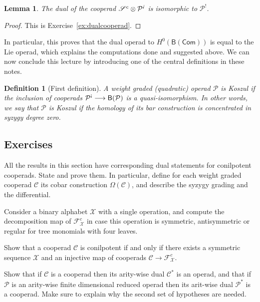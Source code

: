 \documentclass[fleqn, a4paper, twoside]{article}
\newcommand{\antishriek}{\text{\raisebox{\depth}{\textexclamdown}}}
\newcommand{\0}{\langle 0\rangle}
\newcommand{\XX}{\mathcal{X}}
\newcommand{\FF}{\mathcal{F}}
\newcommand{\B}[1]{\mathsf{B}(#1)}
\DeclareRobustCommand{\[}{\begin{equation}}%
\DeclareRobustCommand{\]}{\end{equation}}%
\theoremstyle{mytheorem}
\newtheorem{lemma}[theorem]{Lemma}
\theoremstyle{introthm}
\theoremstyle{mydefinition}
\newtheorem{definition}[theorem]{Definition}
\theoremstyle{mydefinition2}
\theoremstyle{plain} %
\newcommand{\Com}{\mathsf{Com}}
\newcommand{\CC}{\mathcal{C}}
\newcommand{\?}{\,?\,}
\newcommand{\PP}{{\mathcal{P}}}
\theoremstyle{mytheorem}
\theoremstyle{plain} %
\begin{document}
\begin{lemma}\label{lemma:dualcooperad}
The dual of the cooperad  $\sus^c\otimes \PP^\emph{\antishriek}$
is isomorphic to $\PP^!$.
\end{lemma}

\begin{proof}
This is Exercise~\ref{ex:dualcooperad}. 
\end{proof}

In particular, this proves that the dual operad to $H^0(\B{\Com})$ is
equal to the Lie operad, which explains the computations done and suggested
above. We can now conclude this lecture by introducing one of the
central definitions in these notes.

\begin{definition}[First definition]
A weight graded (quadratic) operad $\PP$ is Koszul if
the inclusion of cooperads $\PP^\antishriek \longrightarrow \B{\PP}$
is a quasi-isomorphism. In other words, we say that $\PP$
is Koszul if the homology of its bar construction is
concentrated in syzygy degree zero.
\end{definition}

\subsection{Exercises}	

\begin{question}
All the results in this section have corresponding
dual statements for conilpotent cooperads. State and
prove them. In particular, define for each weight graded
cooperad $\CC$ its cobar construction $\Omega(\CC)$,
and describe the syzygy grading and the differential.
\end{question}

\begin{question}\label{ex:cofree}
Consider a binary alphabet $\XX$ with a single operation,
and compute the decomposition map of $\FF^c_\XX$ in case
this operation is symmetric, antisymmetric or regular 
for tree monomials with four leaves.
\end{question}


\begin{question}\label{ex:conilpotent}
Show that a cooperad $\CC$ is conilpotent if and only if
there exists a symmetric sequence $\XX$ and an injective
map of cooperads $\CC \longrightarrow \FF_\XX^c$. 
\end{question}

\begin{question}\label{ex:takeduals}
Show that if $\CC$ is a cooperad then its arity-wise dual $\CC^*$ 
is an operad, and that if $\PP$ is an arity-wise finite dimensional
reduced operad then its arit-wise dual $\PP^*$ is a cooperad. 
Make sure to explain why the second set of hypotheses are needed.
\end{question}
\end{document}
